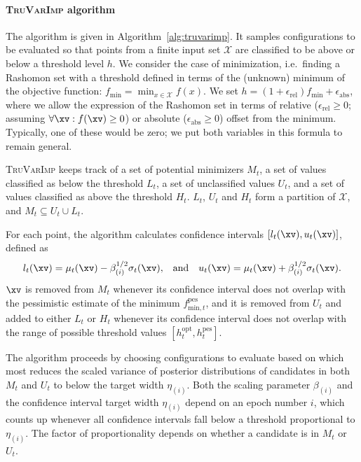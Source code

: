 \documentclass[a4paper,10pt]{article}
\newcommand{\TruVarImp}{\textsc{TruVarImp}\xspace}
\newcommand{\cset}{\mathcal{X}}
\begin{document}
\paragraph{\TruVarImp algorithm}{
    The algorithm is given in Algorithm~\ref{alg:truvarimp}.
    It samples configurations to be evaluated so that points from a finite input set $\cset$ are classified to be above or below a threshold level $h$.
    We consider the case of minimization, i.e.\ finding a Rashomon set with a threshold defined in terms of the (unknown) minimum of the objective function: $f_{\mathrm{min}} = \min_{x \in \cset} f(x)$.
    We set $h = (1 + \epsilon_{\mathrm{rel}}) f_{\mathrm{min}} + \epsilon_{\mathrm{abs}}$, where we allow the expression of the Rashomon set in terms of relative ($\epsilon_{\mathrm{rel}} \ge 0$; assuming $\forall \xv: f(\xv) \ge 0$) or absolute ($\epsilon_{\mathrm{abs}} \ge 0$) offset from the minimum.
    Typically, one of these would be zero; we put both variables in this formula to remain general.

    \TruVarImp keeps track of a set of potential minimizers $M_t$, a set of values classified as below the threshold $L_t$, a set of unclassified values $U_t$, and a set of values classified as above the threshold $H_t$.
    $L_t$, $U_t$ and $H_t$ form a partition of $\cset$, and $M_t \subseteq U_t \cup L_t$.

    For each point, the algorithm calculates confidence intervals $[l_t(\xv), u_t(\xv)]$, defined as
    \begin{equation}
        l_t(\xv) = \mu_t(\xv) - \beta_{(i)}^{1/2}\sigma_t(\xv)\mathrm{,} \quad \mathrm{and} \quad
        u_t(\xv) = \mu_t(\xv) + \beta_{(i)}^{1/2}\sigma_t(\xv)\mathrm{.}\label{eq:confint}
    \end{equation}
    $\xv$ is removed from $M_t$ whenever its confidence interval does not overlap with the pessimistic estimate of the minimum $f_{\mathrm{min},t}^\mathrm{pes}$, and it is removed from $U_t$ and added to either $L_t$ or $H_t$ whenever its confidence interval does not overlap with the range of possible threshold values $[h_t^\mathrm{opt}, h_t^\mathrm{pes}]$. %

    The algorithm proceeds by choosing configurations to evaluate based on which most reduces the scaled variance of posterior distributions of candidates in both $M_t$ and $U_t$ to below the target width $\eta_{(i)}$.
    Both the scaling parameter $\beta_{(i)}$ and the confidence interval target width $\eta_{(i)}$ depend on an epoch number $i$, which counts up whenever all confidence intervals fall below a threshold proportional to $\eta_{(i)}$.
    The factor of proportionality depends on whether a candidate is in $M_t$ or $U_t$.

}
\end{document}
